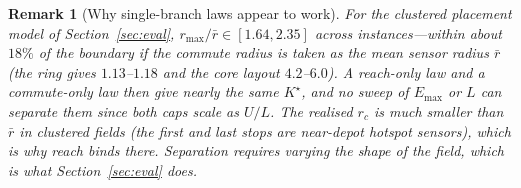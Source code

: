 \documentclass[journal,outdir=./]{IEEEtran}
\newtheorem{remark}{Remark}
\newcommand{\rmax}{r_{\max}}
\newcommand{\rc}{r_{c}}
\newcommand{\Emax}{E_{\max}}
\begin{document}
\begin{remark}[Why single-branch laws appear to work]
For the clustered placement model of Section~\ref{sec:eval}, $\rmax/\bar r\in[1.64,2.35]$ across instances---within about $18\%$ of the boundary if the commute radius is taken as the mean sensor radius $\bar r$ (the ring gives $1.13$--$1.18$ and the core layout $4.2$--$6.0$). A reach-only law and a commute-only law then give nearly the same $K^{\star}$, and no sweep of $\Emax$ or $L$ can separate them since both caps scale as $U/L$. The realised $\rc$ is much smaller than $\bar r$ in clustered fields (the first and last stops are near-depot hotspot sensors), which is why reach binds there. Separation requires varying the \emph{shape} of the field, which is what Section~\ref{sec:eval} does.
\end{remark}
\end{document}

